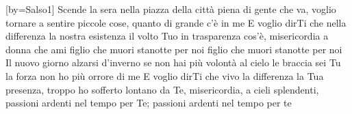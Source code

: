[by={Salso1}]
\beginverse
Scende la sera nella piazza della città
piena di gente che va,
voglio tornare a sentire piccole cose,
quanto di grande c'è in me
\endverse
\beginchorus
E voglio dirTi che
nella differenza la nostra esistenza
il volto Tuo in trasparenza cos'è,
misericordia a donna che ami
figlio che muori stanotte per noi
figlio che muori stanotte per noi
\endchorus
\beginverse
Il nuovo giorno alzarsi d'inverno
se non hai più volontà
al cielo le braccia sei Tu la forza
non ho più orrore di me
\endverse
\beginchorus
E voglio dirTi che
vivo la differenza la Tua presenza,
troppo ho sofferto lontano da Te,
misericordia, a cieli splendenti,
passioni ardenti nel tempo per Te;
passioni ardenti nel tempo per te
\endchorus
\endsong
